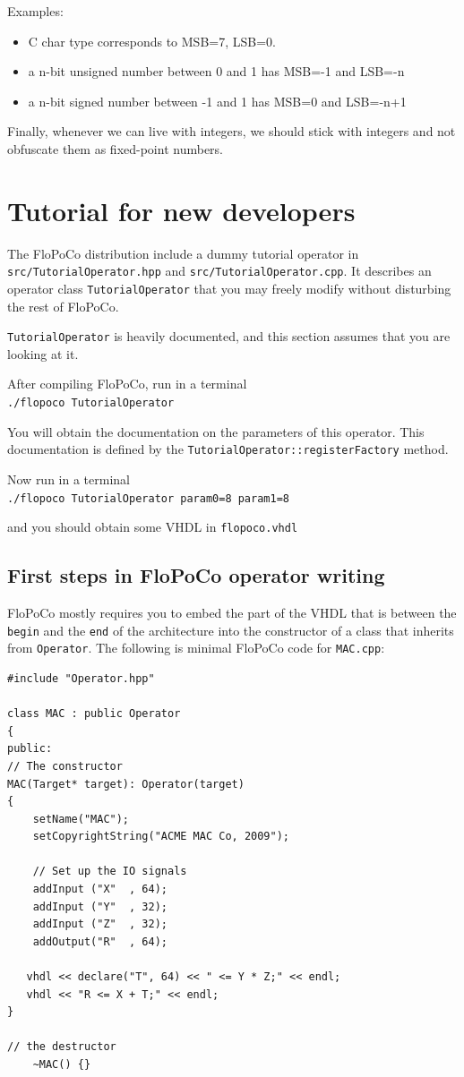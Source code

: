 \documentclass{article}
\begin{document}
Examples:
\begin{itemize}
\item C char type corresponds to MSB=7, LSB=0.
\item a n-bit unsigned number between 0 and 1 has MSB=-1 and LSB=-n
\item a n-bit signed number between -1 and 1 has MSB=0 and LSB=-n+1
\end{itemize}

Finally, whenever we can live with integers, we should stick with integers and not obfuscate them as fixed-point numbers.




\section{Tutorial for new developers \label{sec:tutorial}}

The FloPoCo distribution include a dummy tutorial operator in \texttt{src/TutorialOperator.hpp} and \texttt{src/TutorialOperator.cpp}.
It describes an operator class \texttt{TutorialOperator} that you may freely modify without disturbing the rest of FloPoCo.

\texttt{TutorialOperator} is heavily documented, and this section assumes that you are looking at it.

After compiling FloPoCo, run in a terminal\\
\verb!./flopoco TutorialOperator!

You will obtain the documentation on the parameters of this operator.
This documentation is defined by the \texttt{TutorialOperator::registerFactory} method.

Now run in a terminal\\
\verb!./flopoco TutorialOperator param0=8 param1=8!

and you should obtain  some VHDL in \texttt{flopoco.vhdl}


\subsection{First steps in FloPoCo operator writing}

FloPoCo mostly requires you to embed the part of the VHDL that is between the \texttt{begin} and the \texttt{end} of the architecture
into the constructor of a class that inherits from
\verb!Operator!. The following is minimal FloPoCo code for
\verb!MAC.cpp!:
\begin{verbatim}
#include "Operator.hpp"

class MAC : public Operator
{
public:
// The constructor
MAC(Target* target): Operator(target)
{
	setName("MAC");
	setCopyrightString("ACME MAC Co, 2009");		

	// Set up the IO signals
	addInput ("X"  , 64);
	addInput ("Y"  , 32);
	addInput ("Z"  , 32);
	addOutput("R"  , 64);

   vhdl << declare("T", 64) << " <= Y * Z;" << endl;
   vhdl << "R <= X + T;" << endl;
}

// the destructor
	~MAC() {}
\end{verbatim}
 
\end{document}
